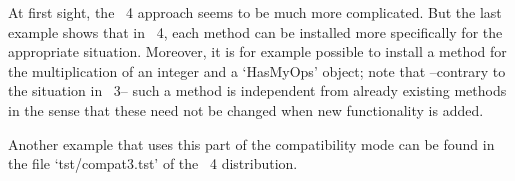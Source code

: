 At first sight, the {\GAP}~4 approach seems to be much more
complicated.
But the last example shows that in {\GAP}~4,
each method can be installed more specifically for the appropriate
situation.
Moreover, it is for example possible to install a method
for the multiplication of an integer and a `HasMyOps' object;
note that --contrary to the situation in {\GAP}~3--
such a method is independent from already existing methods
in the sense that these need not be changed when
new functionality is added.

Another example that uses this part of the compatibility mode can be
found in the file `tst/compat3.tst' of the {\GAP}~4 distribution.




